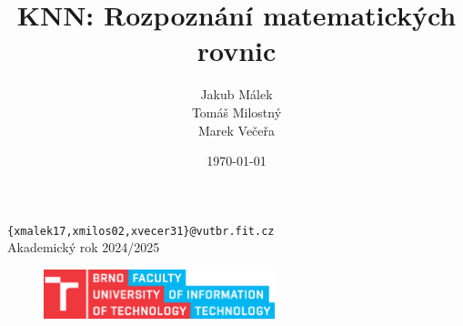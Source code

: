 \documentclass[12pt,a4paper]{article}
\title{KNN: Rozpoznání matematických rovnic}
\author{Jakub Málek\\Tomáš Milostný\\Marek Večeřa}
\date{\today}
\begin{document}
\maketitle
\thispagestyle{empty}   %

\begin{center}
    \large \texttt{\{xmalek17,xmilos02,xvecer31\}@vutbr.fit.cz}\\[1ex]
    \normalsize Akademický rok 2024/2025
\end{center}

\vspace{10cm}
\begin{figure}[H]
    \centering
    \includegraphics[width=0.6\textwidth]{img/FIT_color_CMYK_EN.eps}
\end{figure}


\newpage
\tableofcontents

\newpage


\newpage
\nocite{*}  %
\printbibliography[heading=bibintoc, title={Zdroje}]
\end{document}
